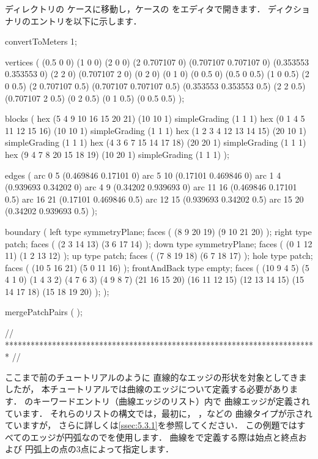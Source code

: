 ディレクトリの
ケースに移動し，ケースの
をエディタで開きます．
ディクショナリのエントリを以下に示します．
\begin{OFverbatim}[file, linenum=17]
convertToMeters 1;

vertices
(
    (0.5 0 0)
    (1 0 0)
    (2 0 0)
    (2 0.707107 0)
    (0.707107 0.707107 0)
    (0.353553 0.353553 0)
    (2 2 0)
    (0.707107 2 0)
    (0 2 0)
    (0 1 0)
    (0 0.5 0)
    (0.5 0 0.5)
    (1 0 0.5)
    (2 0 0.5)
    (2 0.707107 0.5)
    (0.707107 0.707107 0.5)
    (0.353553 0.353553 0.5)
    (2 2 0.5)
    (0.707107 2 0.5)
    (0 2 0.5)
    (0 1 0.5)
    (0 0.5 0.5)
);

blocks
(
    hex (5 4 9 10 16 15 20 21) (10 10 1) simpleGrading (1 1 1)
    hex (0 1 4 5 11 12 15 16) (10 10 1) simpleGrading (1 1 1)
    hex (1 2 3 4 12 13 14 15) (20 10 1) simpleGrading (1 1 1)
    hex (4 3 6 7 15 14 17 18) (20 20 1) simpleGrading (1 1 1)
    hex (9 4 7 8 20 15 18 19) (10 20 1) simpleGrading (1 1 1)
);

edges
(
    arc 0 5 (0.469846 0.17101 0)
    arc 5 10 (0.17101 0.469846 0)
    arc 1 4 (0.939693 0.34202 0)
    arc 4 9 (0.34202 0.939693 0)
    arc 11 16 (0.469846 0.17101 0.5)
    arc 16 21 (0.17101 0.469846 0.5)
    arc 12 15 (0.939693 0.34202 0.5)
    arc 15 20 (0.34202 0.939693 0.5)
);

boundary
(
    left
    {
        type symmetryPlane;
        faces
        (
            (8 9 20 19)
            (9 10 21 20)
        );
    }
    right
    {
        type patch;
        faces
        (
            (2 3 14 13)
            (3 6 17 14)
        );
    }
    down
    {
        type symmetryPlane;
        faces
        (
            (0 1 12 11)
            (1 2 13 12)
        );
    }
    up
    {
        type patch;
        faces
        (
            (7 8 19 18)
            (6 7 18 17)
        );
    }
    hole
    {
        type patch;
        faces
        (
            (10 5 16 21)
            (5 0 11 16)
        );
    }
    frontAndBack
    {
        type empty;
        faces
        (
            (10 9 4 5)
            (5 4 1 0)
            (1 4 3 2)
            (4 7 6 3)
            (4 9 8 7)
            (21 16 15 20)
            (16 11 12 15)
            (12 13 14 15)
            (15 14 17 18)
            (15 18 19 20)
        );
    }
);

mergePatchPairs
(
);

// ************************************************************************* //
\end{OFverbatim}
ここまで前のチュートリアルのように
直線的なエッジの形状を対象としてきましたが，
本チュートリアルでは曲線のエッジについて定義する必要があります．
のキーワードエントリ（曲線エッジのリスト）内で
曲線エッジが定義されています．
それらのリストの構文では，最初に，
，などの
曲線タイプが示されていますが，
さらに詳しくは\autoref{ssec:5.3.1}を参照してください．
この例題ではすべてのエッジが円弧なのでを使用します．
曲線をで定義する際は始点と終点および
円弧上の点の3点によって指定します．

